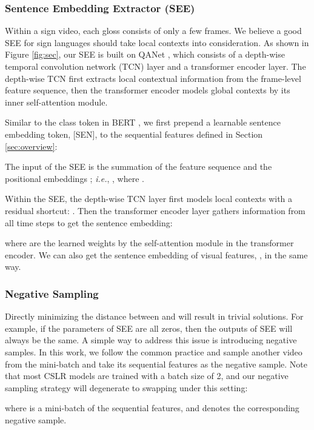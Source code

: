 \documentclass[acmsmall,screen]{acmart}
\def\ie{\emph{i.e.}} \def\Ie{\emph{I.e.}}
\begin{document}
\subsubsection{Sentence Embedding Extractor (SEE)}
Within a sign video, each gloss consists of only a few frames. 
We believe a good SEE for sign languages should take local contexts into consideration.
As shown in Figure \ref{fig:sec}, our SEE is built on QANet \cite{qanet}, which consists of a depth-wise temporal convolution network (TCN) layer and a transformer encoder layer.
The depth-wise TCN first extracts local contextual information from the frame-level feature sequence, then the transformer encoder models global contexts by its inner self-attention module.

Similar to the class token in BERT \cite{kenton2019bert}, we first prepend a learnable sentence embedding token, [SEN], to the sequential features  defined in Section \ref{sec:overview}:

The input of the SEE is the summation of the feature sequence and the positional embeddings \cite{transformer}; \ie, , where .

Within the SEE, the depth-wise TCN \cite{wu2018pay} layer first models local contexts with a residual shortcut: . 
Then the transformer encoder layer gathers information from all time steps to get the sentence embedding:

where  are the learned weights by the self-attention module in the transformer encoder.
We can also get the sentence embedding of visual features, , in the same way.

\subsubsection{Negative Sampling}
Directly minimizing the distance between  and  will result in trivial solutions.
For example, if the parameters of SEE are all zeros, then the outputs of SEE will always be the same.
A simple way to address this issue is introducing negative samples.
In this work, we follow the common practice \cite{schroff2015facenet, ye2019unsupervised, oord2018representation, hjelm2018learning} and sample another video from the mini-batch and take its sequential features as the negative sample.
Note that most CSLR models \cite{vac, self-mutual, stmc, stmc_jour} are trained with a batch size of 2, and our negative sampling strategy will degenerate to swapping under this setting:

where  is a mini-batch of the sequential features, and  denotes the corresponding negative sample.
\end{document}
